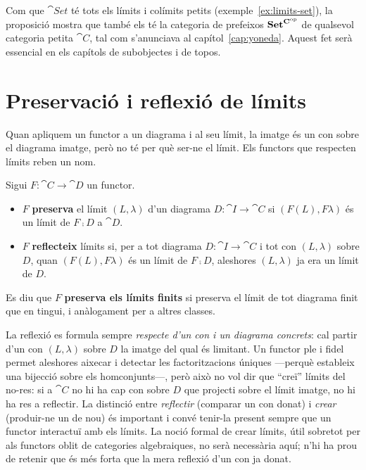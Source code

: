 Com que $\cat{Set}$ té tots els límits i colímits petits (exemple~\ref{ex:limits-set}), la proposició mostra que també els té la categoria de prefeixos $\mathbf{Set}^{\mathbf{C}^{\mathrm{op}}}$ de qualsevol categoria petita $\cat{C}$, tal com s'anunciava al capítol~\ref{cap:yoneda}. Aquest fet serà essencial en els capítols de subobjectes i de topos.

\section{Preservació i reflexió de límits}

Quan apliquem un functor a un diagrama i al seu límit, la imatge és un con sobre el diagrama imatge, però no té per què ser-ne el límit. Els functors que respecten límits reben un nom.

\begin{definicio}
Sigui $F\colon\cat{C}\to\cat{D}$ un functor.
\begin{itemize}
\item $F$ \textbf{preserva} el límit $(L,\lambda)$ d'un diagrama $D\colon\cat{I}\to\cat{C}$ si $(F(L),F\lambda)$ és un límit de $F\comp D$ a $\cat{D}$.
\item $F$ \textbf{reflecteix} límits si, per a tot diagrama $D\colon\cat{I}\to\cat{C}$ i tot con $(L,\lambda)$ sobre $D$, quan $(F(L),F\lambda)$ és un límit de $F\comp D$, aleshores $(L,\lambda)$ ja era un límit de $D$.
\end{itemize}
Es diu que $F$ \textbf{preserva els límits finits} si preserva el límit de tot diagrama finit que en tingui, i anàlogament per a altres classes.
\end{definicio}

\begin{observacio}
La reflexió es formula sempre \emph{respecte d'un con i un diagrama concrets}: cal partir d'un con $(L,\lambda)$ sobre $D$ la imatge del qual és limitant. Un functor ple i fidel permet aleshores aixecar i detectar les factoritzacions úniques ---perquè estableix una bijecció sobre els homconjunts---, però això no vol dir que \enquote{creï} límits del no-res: si a $\cat{C}$ no hi ha cap con sobre $D$ que projecti sobre el límit imatge, no hi ha res a reflectir. La distinció entre \emph{reflectir} (comparar un con donat) i \emph{crear} (produir-ne un de nou) és important i convé tenir-la present sempre que un functor interactuï amb els límits. La noció formal de crear límits, útil sobretot per als functors oblit de categories algebraiques, no serà necessària aquí; n'hi ha prou de retenir que és més forta que la mera reflexió d'un con ja donat.
\end{observacio}

